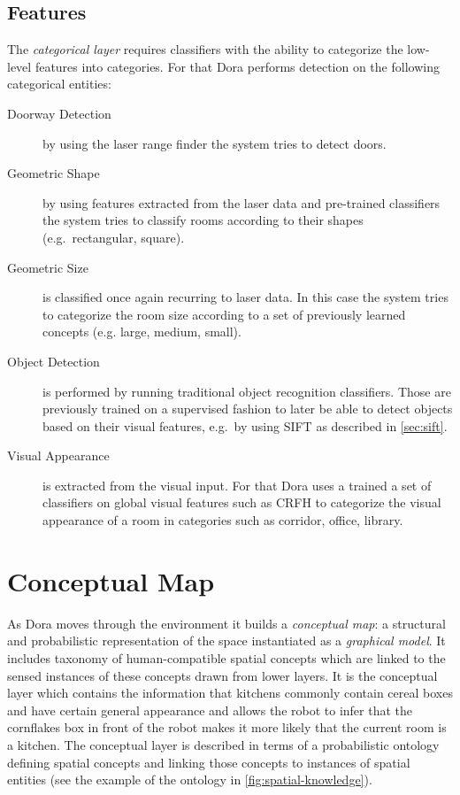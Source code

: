 \subsection{Features}
\label{sec:dora-features}
The \emph{categorical layer} requires classifiers with the ability to categorize the
low\hyp{}level features into categories.
For that \gls{Dora} performs detection on the following categorical entities:
\begin{description}
\item[Doorway Detection] by using the laser range finder the system tries to detect doors.
\item[Geometric Shape] by using features extracted from the laser data and pre-trained classifiers
the system tries to classify rooms according to their shapes (e.g.\ rectangular, square).
\item[Geometric Size] is classified once again recurring to laser data. In this case the system
tries to categorize the room size according to a set of previously learned concepts (e.g. large, medium, small).
\item[Object Detection] is performed by running traditional object recognition classifiers.
Those are previously trained on a supervised fashion to later be able to detect objects
based on their visual features, e.g.\ by using \gls{SIFT} as described in \autoref{sec:sift}.
\item[Visual Appearance] is extracted from the visual input. For that Dora uses a trained
a set of classifiers on global visual features such as \gls{CRFH} to categorize the visual
appearance of a room in categories such as corridor, office, library.
\end{description}

\section{Conceptual Map}
\label{sec:conceptual-map}
As \gls{Dora} moves through the environment it builds a \emph{conceptual map}: a structural and
probabilistic representation of the space instantiated as a \emph{graphical model}.
It includes taxonomy of human\hyp{}compatible spatial concepts which are linked to the sensed 
instances of these concepts drawn from lower layers. It is the conceptual layer which 
contains the information that kitchens commonly contain cereal boxes and have certain 
general appearance and allows the robot to infer that the cornflakes box in front of the 
robot makes it more likely that the current room is a kitchen. The conceptual layer is 
described in terms of a probabilistic ontology defining spatial concepts and linking 
those concepts to instances of spatial entities (see the example of the ontology in
\autoref{fig:spatial-knowledge}).

